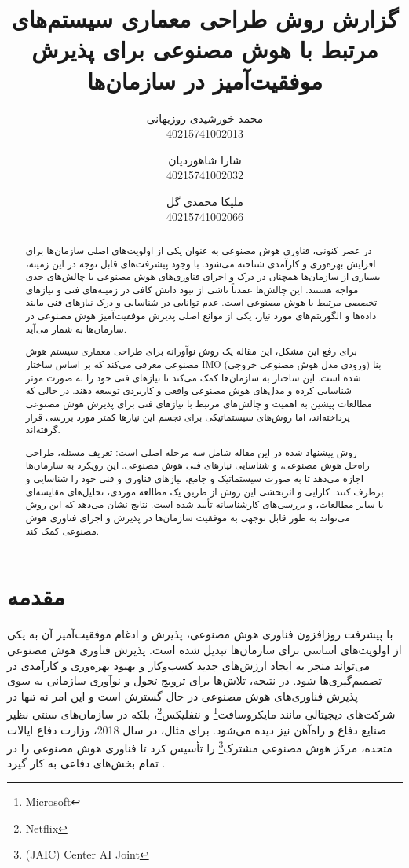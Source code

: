 \documentclass[a4paper,10pt]{article}
\title{گزارش روش طراحی معماری سیستم‌‌های مرتبط با هوش مصنوعی برای پذیرش موفقیت‌آمیز در سازمان‌ها}
\author{محمد خورشیدی روزبهانی\\40215741002013 \and شارا شاهوردیان\\40215741002032 \and ملیکا محمدی گل\\40215741002066}
\date{}
\begin{document}
    \maketitle

    \vspace{0.5cm}

    \begin{abstract}

        در عصر کنونی، فناوری هوش مصنوعی به عنوان یکی از اولویت‌های اصلی سازمان‌ها برای افزایش بهره‌وری و کارآمدی شناخته می‌شود. با وجود پیشرفت‌های قابل توجه در این زمینه، بسیاری از سازمان‌ها همچنان در درک و اجرای فناوری‌های هوش مصنوعی با چالش‌های جدی مواجه هستند. این چالش‌ها عمدتاً ناشی از نبود دانش کافی در زمینه‌های فنی و نیازهای تخصصی مرتبط با هوش مصنوعی است. عدم توانایی در شناسایی و درک نیازهای فنی مانند داده‌ها و الگوریتم‌های مورد نیاز، یکی از موانع اصلی پذیرش موفقیت‌آمیز هوش مصنوعی در سازمان‌ها به شمار می‌آید.

        برای رفع این مشکل، این مقاله یک روش نوآورانه برای طراحی معماری سیستم هوش مصنوعی معرفی می‌کند که بر اساس ساختار IMO (ورودی-مدل هوش مصنوعی-خروجی) بنا شده است. این ساختار به سازمان‌ها کمک می‌کند تا نیازهای فنی خود را به صورت موثر شناسایی کرده و مدل‌های هوش مصنوعی واقعی و کاربردی توسعه دهند. در حالی که مطالعات پیشین به اهمیت و چالش‌های مرتبط با نیازهای فنی برای پذیرش هوش مصنوعی پرداخته‌اند، اما روش‌های سیستماتیکی برای تجسم این نیازها کمتر مورد بررسی قرار گرفته‌اند.

        روش پیشنهاد شده در این مقاله شامل سه مرحله اصلی است: تعریف مسئله، طراحی راه‌حل هوش مصنوعی، و شناسایی نیازهای فنی هوش مصنوعی. این رویکرد به سازمان‌ها اجازه می‌دهد تا به صورت سیستماتیک و جامع، نیازهای فناوری و فنی خود را شناسایی و برطرف کنند. کارایی و اثربخشی این روش از طریق یک مطالعه موردی، تحلیل‌های مقایسه‌ای با سایر مطالعات، و بررسی‌های کارشناسانه تأیید شده است. نتایج نشان می‌دهد که این روش می‌تواند به طور قابل توجهی به موفقیت سازمان‌ها در پذیرش و اجرای فناوری هوش مصنوعی کمک کند.

    \end{abstract}

    \section{مقدمه}

        با پیشرفت روزافزون فناوری هوش مصنوعی، پذیرش و ادغام موفقیت‌آمیز آن به یکی از اولویت‌های اساسی برای سازمان‌ها تبدیل شده است. پذیرش فناوری هوش مصنوعی می‌تواند منجر به ایجاد ارزش‌های جدید کسب‌وکار و بهبود بهره‌وری و کارآمدی در تصمیم‌گیری‌ها شود. در نتیجه، تلاش‌ها برای ترویج تحول و نوآوری سازمانی به سوی پذیرش فناوری‌های هوش مصنوعی در حال گسترش است و این امر نه تنها در شرکت‌های دیجیتالی مانند مایکروسافت\footnote{\hspace{2pt}Microsoft} و نتفلیکس\footnote{\hspace{2pt}Netflix}، بلکه در سازمان‌های سنتی نظیر صنایع دفاع و راه‌آهن نیز دیده می‌شود. برای مثال، در سال 2018، وزارت دفاع ایالات متحده، مرکز هوش مصنوعی مشترک\footnote{\hspace{2pt}(JAIC) Center AI Joint} را تأسیس کرد تا فناوری هوش مصنوعی را در تمام بخش‌های دفاعی به کار گیرد .
\end{document}

